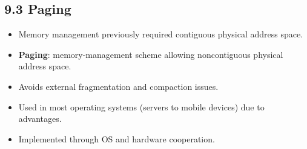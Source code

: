\subsection{9.3 Paging}

\begin{itemize}
    \item Memory management previously required contiguous physical address space.
    \item \textbf{Paging}: memory-management scheme allowing noncontiguous physical address space.
    \item Avoids external fragmentation and compaction issues.
    \item Used in most operating systems (servers to mobile devices) due to advantages.
    \item Implemented through OS and hardware cooperation.
\end{itemize}

